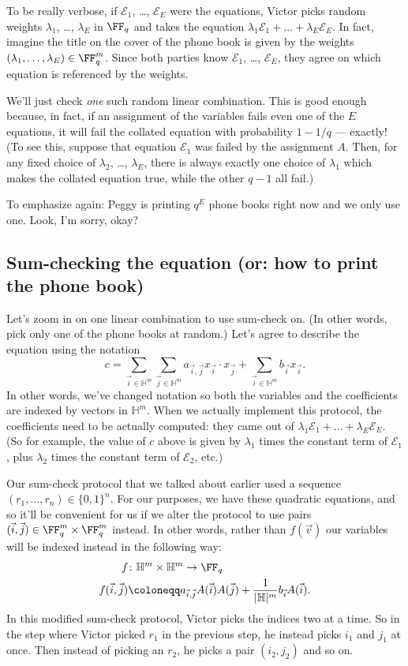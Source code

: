 \documentclass[11pt]{scrreprt}
\newcommand{\HH}{\mathbb H}
\begin{document}
To be really verbose, if $\mathcal{E}_1$, \dots, $\mathcal{E}_E$ were the equations,
Victor picks random weights $\lambda_1$, \dots, $\lambda_E$ in $\FF_q$
and takes the equation $\lambda_1 \mathcal{E}_1 + \dots + \lambda_E \mathcal{E}_E$.
In fact, imagine the title on the cover of the phone book is
given by the weights $(\lambda_1, \dots, \lambda_E) \in \FF_q^m$.
Since both parties know $\mathcal E_1$, \dots, $\mathcal E_E$,
they agree on which equation is referenced by the weights.

We'll just check \emph{one} such random linear combination.
This is good enough because, in fact,
if an assignment of the variables fails even one of the $E$ equations,
it will fail the collated equation with probability $1 - 1/q$ --- exactly!
(To see this, suppose that equation $\mathcal E_1$ was failed by the assignment $A$.
Then, for any fixed choice of $\lambda_2$, \dots, $\lambda_E$, there is always
exactly one choice of $\lambda_1$ which makes the collated equation true,
while the other $q-1$ all fail.)

To emphasize again: Peggy is printing $q^E$ phone books right now and we only use one.
Look, I'm sorry, okay?

\subsection{Sum-checking the equation (or: how to print the phone book)}
Let's zoom in on one linear combination to use sum-check on.
(In other words, pick only one of the phone books at random.)
Let's agree to describe the equation using the notation
\[
  c = \sum_{\vec i \in \HH^m} \sum_{\vec j \in \HH^m}
  a_{\vec i, \vec j} x_{\vec i} \cdot x_{\vec j}
  + \sum_{\vec i \in \HH^m} b_{\vec i} x_{\vec i}.
\]
In other words, we've changed notation so both the variables
and the coefficients are indexed by vectors in $\HH^m$.
When we actually implement this protocol, the coefficients need to be actually computed:
they came out of $\lambda_1 \mathcal{E}_1 + \dots + \lambda_E {\mathcal E}_E$.
(So for example, the value of $c$ above is given
by $\lambda_1$ times the constant term of $\mathcal E_1$,
plus $\lambda_2$ times the constant term of $\mathcal E_2$, etc.)

Our sum-check protocol that we talked about earlier
used a sequence $(r_1, \dots, r_n) \in \{0,1\}^n$.
For our purposes, we have these quadratic equations,
and so it'll be convenient for us if we alter the protocol to use pairs
$(\vec i, \vec j) \in \FF_q^m \times \FF_q^m$ instead.
In other words, rather than $f(\vec v)$
our variables will be indexed instead in the following way:
\begin{align*}
  f &\colon \HH^m \times \HH^m \to \FF_q \\
  f(\vec i, \vec j) &\coloneqq
    a_{\vec i, \vec j} A(\vec i) A(\vec j)
    + \frac{1}{|\HH|^m} b_{\vec i} A(\vec i).
\end{align*}
In this modified sum-check protocol, Victor picks the indices two at a time.
So in the step where Victor picked $r_1$ in the previous step,
he instead picks $i_1$ and $j_1$ at once.
Then instead of picking an $r_2$, he picks a pair $(i_2, j_2)$ and so on.
\end{document}
